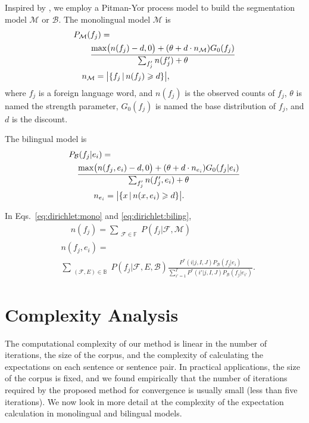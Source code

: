 \documentclass[11pt]{article}
\begin{document}
Inspired by \cite{teh2006hierarchical,mochihashi2009bayesian,neubig2010learning,teh2010hierarchical}, we employ a Pitman-Yor process model to build
the segmentation model $\mathcal{M}$ or $\mathcal{B}$.  The monolingual
model $\mathcal{M}$ is
\begin{align}
& P_\mathcal{M}(f_j) =   \nonumber \\
&\quad\quad \frac{ \mathrm{max}\big(n\small(f_j\small)-d,0\big) + (\theta +d \cdot n_\mathcal{M})G_0\small(f_j\small) } {\sum_{f_j'}n\small(f_j'\small)+\theta}  \nonumber \\
&\quad n_\mathcal{M}=\big|\{f_j \, | \, n(f_j) \geqslant d\}\big| ,  \label{eq:dirichlet:mono} 
\end{align}
where $f_j$ is a foreign language word, and $n(f_j)$ is the observed counts of $f_j$, $\theta$ is named the strength parameter, $G_0(f_j)$ is named the base distribution of $f_j$, and $d$ is the discount. 

 The bilingual model is
\begin{align}
&P_\mathcal{B}(f_j|e_i)   =  \nonumber \\
&\quad \frac{ \mathrm{max}\big(n\small(f_j,e_i\small)-d,0\big) + (\theta +d \cdot n_{e_i})G_0\small(f_j|e_i\small) } {\sum_{f_j'}n\small(f_j',e_i\small)+\theta} \nonumber \\
&\qquad \quad n_{e_i}=\big|\{x \, | \,  n(x,e_i) \geqslant d\}\big|.  \label{eq:dirichlet:biling}  
\end{align}

In Eqs.~\ref{eq:dirichlet:mono} and \ref{eq:dirichlet:biling},
\begin{align}
&\quad \, n(f_j) = \sum_{\substack{\mathcal{F} \in \mathbb{F}} }P(f_j|\mathcal{F},\mathcal{M}) \label{eq:nf}\\
&n(f_j,e_i)=   \nonumber \\
&\sum_{\substack{(\mathcal{F},E) \in \mathbb{B}}}P(f_j|\mathcal{F},E,\mathcal{B})  \frac{P^*(i|j,I,J)  P_\mathcal{B}(f_j|e_i)}{\sum_{i'=1}^I P^*(i'|j,I,J)  P_\mathcal{B}(f_j|e_{i'})}.
\end{align}

\section{Complexity Analysis}
\label{sec:complexity}
The computational complexity of our method is linear in the number of
iterations, the size of the corpus, and the complexity of calculating
the expectations on each sentence or sentence pair. In practical
applications, the size of the corpus is fixed, and we found empirically that the number of 
iterations required by the proposed method for convergence is usually small (less than five
iterations). We now look in more detail at the complexity of the expectation calculation in
monolingual and bilingual models.
\end{document}
